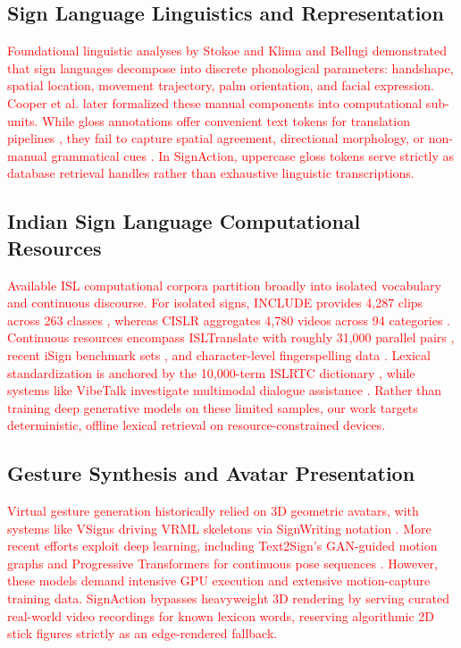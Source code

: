 \documentclass[conference,a4paper,10pt]{IEEEtran}
\begin{document}
\subsection{Sign Language Linguistics and Representation}

\textcolor{red}{Foundational linguistic analyses by Stokoe \cite{stokoe1960} and Klima and Bellugi \cite{klima1979} demonstrated that sign languages decompose into discrete phonological parameters: handshape, spatial location, movement trajectory, palm orientation, and facial expression. Cooper et al. \cite{cooper2012} later formalized these manual components into computational sub-units. While gloss annotations offer convenient text tokens for translation pipelines \cite{neidle2001, camgoz2020}, they fail to capture spatial agreement, directional morphology, or non-manual grammatical cues \cite{bragg2019}. In SignAction, uppercase gloss tokens serve strictly as database retrieval handles rather than exhaustive linguistic transcriptions.}

\subsection{Indian Sign Language Computational Resources}

\textcolor{red}{Available ISL computational corpora partition broadly into isolated vocabulary and continuous discourse. For isolated signs, INCLUDE provides 4{,}287 clips across 263 classes \cite{sridhar2020}, whereas CISLR aggregates 4{,}780 videos across 94 categories \cite{joshi2022cislr}. Continuous resources encompass ISLTranslate with roughly 31{,}000 parallel pairs \cite{joshi2023isltranslate}, recent iSign benchmark sets \cite{joshi2024isign}, and character-level fingerspelling data \cite{kirandevraj2025}. Lexical standardization is anchored by the 10{,}000-term ISLRTC dictionary \cite{islrtc2021}, while systems like VibeTalk investigate multimodal dialogue assistance \cite{undri2026vibetalk}. Rather than training deep generative models on these limited samples, our work targets deterministic, offline lexical retrieval on resource-constrained devices.}

\subsection{Gesture Synthesis and Avatar Presentation}

\textcolor{red}{Virtual gesture generation historically relied on 3D geometric avatars, with systems like VSigns driving VRML skeletons via SignWriting notation \cite{papadogiorgaki2004, rastgoo2021}. More recent efforts exploit deep learning, including Text2Sign's GAN-guided motion graphs \cite{stoll2020} and Progressive Transformers for continuous pose sequences \cite{saunders2020}. However, these models demand intensive GPU execution and extensive motion-capture training data. SignAction bypasses heavyweight 3D rendering by serving curated real-world video recordings for known lexicon words, reserving algorithmic 2D stick figures strictly as an edge-rendered fallback.}
\end{document}
